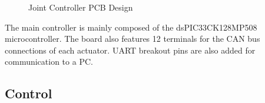\documentclass[english]{upeeei}
\begin{document}
\begin{figure}[H]
\begin{centering}
\par\end{centering}
\begin{centering}
\par\end{centering}
\caption{Joint Controller PCB Design\label{fig:joint-controller}}
\end{figure}

The main controller is mainly composed of the dsPIC33CK128MP508 microcontroller. The board also features 12 terminals for the CAN bus connections of each actuator. UART breakout pins are also added for communication to a PC.

\subsection{Control}
\end{document}
